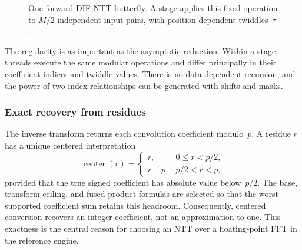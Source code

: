 \begin{figure}[!htbp]
\centering
{}
\caption[Radix-2 NTT butterfly]{One forward DIF NTT butterfly.  A stage applies this fixed
  operation to $M/2$ independent input pairs, with position-dependent twiddles~$\tau$.}
\label{fig:ntt-butterfly}
\end{figure}

The regularity is as important as the asymptotic reduction.  Within a stage,
threads execute the same modular operations and differ principally in their
coefficient indices and twiddle values.  There is no data-dependent recursion,
and the power-of-two index relationships can be generated with shifts and
masks.

\subsubsection{Exact recovery from residues}

The inverse transform returns each convolution coefficient modulo~$p$.  A
residue $r$ has a unique centered interpretation
\begin{equation}
  \operatorname{center}(r)=
  \begin{cases}
    r, & 0\le r < p/2, \\
    r-p, & p/2 < r < p,
  \end{cases}
  \label{eq:ntt-centered-residue}
\end{equation}
provided that the true signed coefficient has absolute value below~$p/2$.
The base, transform ceiling, and fused product formulas are selected so that
the worst supported coefficient sum retains this headroom.  Consequently,
centered conversion recovers an integer coefficient, not an approximation to
one.  This exactness is the central reason for choosing an NTT over a
floating-point FFT in the reference engine.

